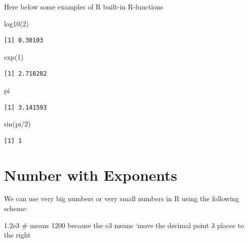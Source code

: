 \documentclass[
  letterpaper,
  DIV=11,
  numbers=noendperiod]{scrreprt}
\newenvironment{Shaded}{\begin{snugshade}}{\end{snugshade}}
\newcommand{\CommentTok}[1]{\textcolor[rgb]{0.37,0.37,0.37}{#1}}
\newcommand{\DecValTok}[1]{\textcolor[rgb]{0.68,0.00,0.00}{#1}}
\newcommand{\FloatTok}[1]{\textcolor[rgb]{0.68,0.00,0.00}{#1}}
\newcommand{\FunctionTok}[1]{\textcolor[rgb]{0.28,0.35,0.67}{#1}}
\newcommand{\NormalTok}[1]{\textcolor[rgb]{0.00,0.23,0.31}{#1}}
\newcommand{\SpecialCharTok}[1]{\textcolor[rgb]{0.37,0.37,0.37}{#1}}
\begin{document}
Here below some examples of R built-in R-functions

\begin{Shaded}
\begin{Highlighting}[]
\FunctionTok{log10}\NormalTok{(}\DecValTok{2}\NormalTok{)}
\end{Highlighting}
\end{Shaded}

\begin{verbatim}
[1] 0.30103
\end{verbatim}

\begin{Shaded}
\begin{Highlighting}[]
\FunctionTok{exp}\NormalTok{(}\DecValTok{1}\NormalTok{)}
\end{Highlighting}
\end{Shaded}

\begin{verbatim}
[1] 2.718282
\end{verbatim}

\begin{Shaded}
\begin{Highlighting}[]
\NormalTok{pi}
\end{Highlighting}
\end{Shaded}

\begin{verbatim}
[1] 3.141593
\end{verbatim}

\begin{Shaded}
\begin{Highlighting}[]
\FunctionTok{sin}\NormalTok{(pi}\SpecialCharTok{/}\DecValTok{2}\NormalTok{)}
\end{Highlighting}
\end{Shaded}

\begin{verbatim}
[1] 1
\end{verbatim}

\hypertarget{number-with-exponents}{%
\section{Number with Exponents}\label{number-with-exponents}}

We can use very big numbers or very small numbers in R using the
following scheme:

\begin{Shaded}
\begin{Highlighting}[]
\FloatTok{1.2e3} \CommentTok{\# means 1200 because the e3 means ‘move the decimal point 3 places to the right }
\end{Highlighting}
\end{Shaded}
\end{document}
